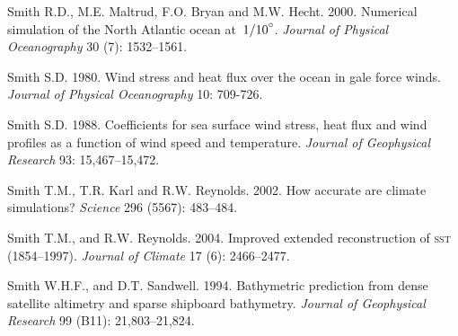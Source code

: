 \begin{thebibliography}{999}
Smith R.D., M.E. Maltrud, F.O. Bryan and M.W. Hecht. 2000. Numerical
simulation of the North Atlantic ocean
at~${1/10}^\circ$. \textit{Journal of Physical Oceanography} 30 (7):
1532--1561.
%

Smith S.D.  1980. Wind stress and heat flux over the ocean in gale
force winds. \textit{Journal of Physical Oceanography} 10: 709-726.
%

Smith S.D.  1988. Coefficients for sea surface wind stress, heat flux
and wind profiles as a function of wind speed and
temperature. \textit{Journal of Geophysical Research} 93:
15,467--15,472.
%

Smith T.M., T.R. Karl and R.W. Reynolds.  2002. How accurate are
climate simulations? \textit{Science} 296 (5567): 483--484.
%

Smith T.M., and R.W. Reynolds.  2004. Improved extended reconstruction
of \textsc{sst} (1854--1997). \textit{Journal of Climate} 17 (6):
2466--2477.
%

Smith W.H.F., and D.T. Sandwell.  1994. Bathymetric prediction from
dense satellite altimetry and sparse shipboard
bathymetry. \textit{Journal of Geophysical Research} 99 (B11):
21,803--21,824.
%


\end{thebibliography}
